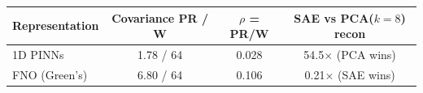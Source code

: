 \begin{tabular}{lccc}
\toprule
Representation & Covariance PR / W & $\rho$ = PR/W & SAE vs PCA($k{=}8$) recon \\
\midrule
1D PINNs & 1.78 / 64 & 0.028 & 54.5$\times$ (PCA wins) \\
FNO (Green's) & 6.80 / 64 & 0.106 & 0.21$\times$ (SAE wins) \\
\bottomrule
\end{tabular}
